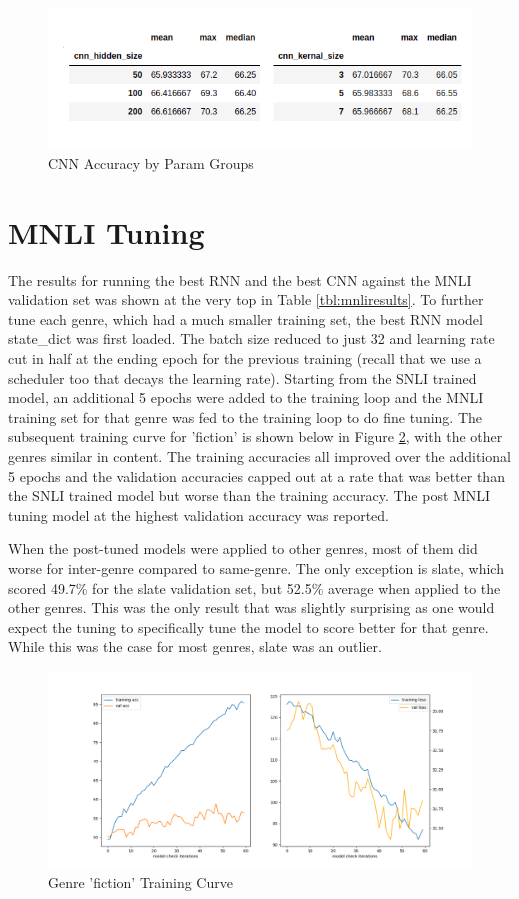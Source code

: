 \documentclass[a4paper,10pt]{article}
\begin{document}
\begin{figure}[h]
    \centering
    \includegraphics[scale=0.7]{cnn_params}
    \caption{CNN Accuracy by Param Groups}
    \label{fig:cnnparams}
\end{figure}

\section{MNLI Tuning}
The results for running the best RNN and the best CNN against the MNLI validation set was shown at the very top in Table \ref{tbl:mnliresults}. To further tune each genre, which had a much smaller training set, the best RNN model state\_dict was first loaded. The batch size reduced to just 32 and learning rate cut in half at the ending epoch for the previous training (recall that we use a scheduler too that decays the learning rate). Starting from the SNLI trained model, an additional 5 epochs were added to the training loop and the MNLI training set for that genre was fed to the training loop to do fine tuning. The subsequent training curve for 'fiction' is shown below in Figure \ref{fig:fictioncurve}, with the other genres similar in content. The training accuracies all improved over the additional 5 epochs and the validation accuracies capped out at a rate that was better than the SNLI trained model but worse than the training accuracy. The post MNLI tuning model at the highest validation accuracy was reported.

\par
\justify
When the post-tuned models were applied to other genres, most of them did worse for inter-genre compared to same-genre. The only exception is slate, which scored 49.7\% for the slate validation set, but 52.5\% average when applied to the other genres. This was the only result that was slightly surprising as one would expect the tuning to specifically tune the model to score better for that genre. While this was the case for most genres, slate was an outlier.

\begin{figure}[h]
    \centering
    \includegraphics[scale=0.4]{fiction}
    \caption{Genre 'fiction' Training Curve}
    \label{fig:fictioncurve}
\end{figure}

\medskip


\end{document}
